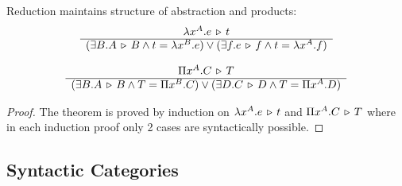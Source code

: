 \begin{lemma} Reduction maintains structure of abstraction and products:
  $$
  \begin{array}{c} \lambda x^A. e \,\triangleright\, t \\ \hline (\exists B. A \,\triangleright\, B \land t = \lambda x^B.e)
    \lor
  (\exists f. e \,\triangleright\, f \land t = \lambda x^A.f)\end{array}
  $$

  $$
  \begin{array}{c} \Pi x^A. C \,\triangleright\, T \\ \hline (\exists B. A \,\triangleright\, B \land T = \Pi x^B.C)
    \lor
  (\exists D. C \,\triangleright\, D \land T = \Pi x^A.D)\end{array}
  $$

  \begin{proof}
    The theorem is proved by induction on $\lambda x^A. e \,\triangleright\, t$ and
    $\Pi x^A. C \,\triangleright\, T$ where in each induction proof only 2 cases are
    syntactically possible.
  \end{proof}
\end{lemma}




\subsection{Syntactic Categories}

